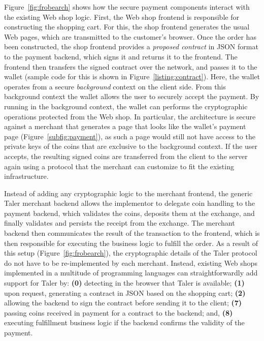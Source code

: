 \documentclass{IEEEtran}
\begin{document}
Figure~\ref{fig:frobearch} shows how the secure payment components
interact with the existing Web shop logic.  First, the Web shop
frontend is responsible for constructing the shopping cart.  For this,
the shop frontend generates the usual Web pages, which are transmitted to the
customer's browser.  Once the order has been constructed,
the shop frontend provides a {\em proposed contract} in JSON format to the
payment backend, which signs it and returns it to the frontend.  The frontend
then transfers the signed contract over the network, and passes it to the
wallet (sample code for this is shown in Figure~\ref{listing:contract}).
Here, the wallet operates from a secure {\em background} context on the
client side.  From this background context the wallet allows the user to
securely accept the payment. By running in the background context,
the wallet can performs the cryptographic operations protected from the
Web shop. In particular, the architecture is secure against a merchant that
generates a page that looks like the wallet's payment page
(Figure~\ref{subfig:payment}), as such a page would still not have
access to the private keys of the coins that are exclusive to the background
context.  If
the user accepts, the resulting signed coins are transferred from the
client to the server again using a protocol that the merchant can
customize to fit the existing infrastructure.

Instead of adding any cryptographic logic to the merchant frontend,
the generic Taler merchant backend allows the implementor to delegate
coin handling to the payment backend, which validates the coins,
deposits them at the exchange, and finally validates and persists the
receipt from the exchange.  The merchant backend then communicates the
result of the transaction to the front\-end, which is then responsible
for executing the business logic to fulfill the order.  As a result of
this setup (Figure~\ref{fig:frobearch}), the cryptographic details
of the Taler protocol do not have to be re-implemented by each
merchant.  Instead, existing Web shops implemented in a multitude of
programming languages can straightforwardly add support for Taler by:
{\bf (0)} detecting in the browser that Taler is available; {\bf (1)}
upon request, generating a contract in JSON based on the shopping
cart; {\bf (2)} allowing the backend to sign the contract before
sending it to the client; {\bf (7)} passing coins received in payment
for a contract to the backend; and, {\bf (8)} executing fulfillment
business logic if the backend confirms the validity of the payment.
\end{document}
